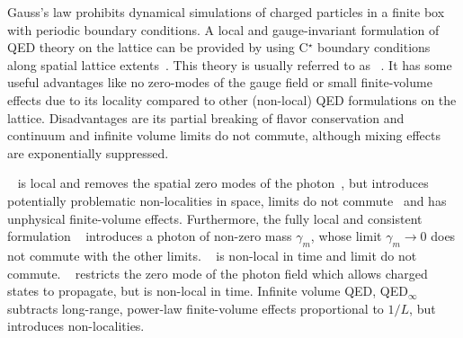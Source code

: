 Gauss's law prohibits dynamical simulations of charged particles in a finite box with periodic boundary conditions.
A local and gauge-invariant formulation of QED theory on the lattice can be provided by using C$^{\star}$ boundary conditions along spatial lattice extents~\cite{cstar:Wiese1992,cstar:Polley1993,cstar:Kronfeld1991,cstar:Kronfeld1993}.
This theory is usually referred to as ~\cite{Lucini:2015}.
It has some useful advantages like no zero-modes of the gauge field or small finite-volume effects due to its locality compared to other (non-local) QED formulations on the lattice.
Disadvantages are its partial breaking of flavor conservation and continuum and infinite volume limits do not commute, although mixing effects are exponentially suppressed.

~\cite{BMW:2014pzb,10.1143/PTP.120.413} is local and removes the spatial zero modes of the photon~\cite{Lucini:2015}, but introduces potentially problematic non-localities in space, limits do not commute~\cite{Patella:2017fgk} and has unphysical finite-volume effects.
Furthermore, the fully local and consistent formulation ~\cite{PhysRevLett.117.072002} introduces a photon of non-zero mass $\gamma_m$, whose limit $\gamma_m \to 0$ does not commute with the other limits.
~\cite{Duncan:1996xy} is non-local in time and limit do not commute.
~\cite{Gockeler:1989wj} restricts the zero mode of the photon field which allows charged states to propagate, but is non-local in time.
Infinite volume QED, QED$_{\infty}$~\cite{Asmussen:2016lse,Blum:2017cer,RBC_2018,Feng:2018qpx} subtracts  long-range, power-law finite-volume effects proportional to $1/L$, but introduces non-localities.


